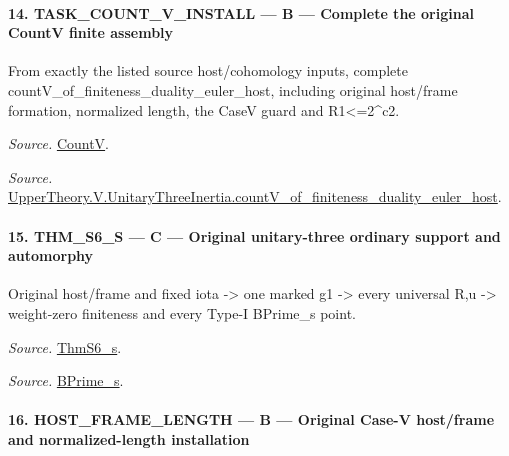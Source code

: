 \paragraph{14. TASK\_\allowbreak COUNT\_\allowbreak V\_\allowbreak INSTALL — B — Complete the original CountV finite assembly}

From exactly the listed source host/cohomology inputs, complete countV\_\allowbreak of\_\allowbreak finiteness\_\allowbreak duality\_\allowbreak euler\_\allowbreak host, including original host/frame formation, normalized length, the CaseV guard and R1<=2\textasciicircum{}c2.

\emph{Source.} \href{https://github.com/CocoSgt/riemann-hypothesis-lean/blob/7cbf7a0c32fca1badf05931879a37c3f8a2b03b4/src/Development/AutomorphicArithmetic/AutomorphicVarieties/HeightAndVanishing/Counts.lean#L69-L69}{CountV}.

\emph{Source.} \href{https://github.com/CocoSgt/riemann-hypothesis-lean/blob/7cbf7a0c32fca1badf05931879a37c3f8a2b03b4/src/Development/AutomorphicArithmetic/AutomorphicVarieties/ModularityArgument/ThresholdArguments/DenseThresholdCases/CountVOf.lean#L33-L60}{UpperTheory.V.UnitaryThreeInertia.countV\_\allowbreak of\_\allowbreak finiteness\_\allowbreak duality\_\allowbreak euler\_\allowbreak host}.



\paragraph{15. THM\_\allowbreak S6\_\allowbreak S — C — Original unitary-three ordinary support and automorphy}

Original host/frame and fixed iota -> one marked g1 -> every universal R,u -> weight-zero finiteness and every Type-I BPrime\_\allowbreak s point.

\emph{Source.} \href{https://github.com/CocoSgt/riemann-hypothesis-lean/blob/7cbf7a0c32fca1badf05931879a37c3f8a2b03b4/src/Development/AutomorphicArithmetic/AutomorphicVarieties/ModularityArgument/ThresholdArguments/DenseThresholdCases/ThmS6CoreS.lean#L17-L26}{ThmS6\_\allowbreak s}.

\emph{Source.} \href{https://github.com/CocoSgt/riemann-hypothesis-lean/blob/7cbf7a0c32fca1badf05931879a37c3f8a2b03b4/src/Development/AutomorphicArithmetic/AutomorphicVarieties/ModularityArgument/ThresholdArguments/DenseThresholdCases/ThmS6CoreS.lean#L12-L16}{BPrime\_\allowbreak s}.



\paragraph{16. HOST\_\allowbreak FRAME\_\allowbreak LENGTH — B — Original Case-V host/frame and normalized-length installation}

